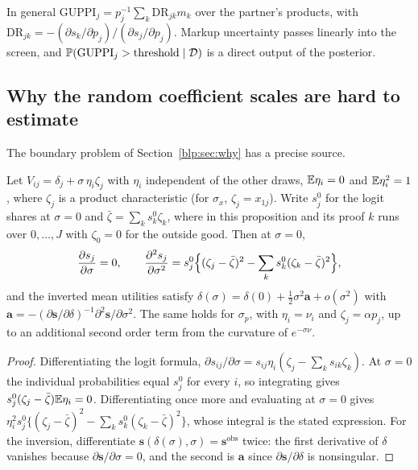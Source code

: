 \begin{remark}
In general $\mathrm{GUPPI}_j = p_j^{-1}\sum_{k}\mathrm{DR}_{jk}m_k$ over the partner's products, with
$\mathrm{DR}_{jk} = -(\partial s_k/\partial p_j)/(\partial s_j/\partial p_j)$. Markup uncertainty passes linearly into the screen, and $\mathbb{P}(\mathrm{GUPPI}_j > \text{threshold}\mid\mathcal{D})$ is a
direct output of the posterior.
\end{remark}

\subsection{Why the random coefficient scales are hard to estimate}

The boundary problem of Section~\ref{blp:sec:why} has a precise source.

\begin{proposition}\label{blp:prop:flat}
Let $V_{ij} = \delta_j + \sigma\,\eta_i \zeta_j$ with $\eta_i$ independent of the other draws,
$\mathbb{E}\eta_i = 0$ and $\mathbb{E}\eta_i^2 = 1$, where $\zeta_j$ is a product characteristic (for $\sigma_x$,
$\zeta_j = x_{1j}$). Write $s^0_j$ for the logit shares at $\sigma = 0$ and
$\bar\zeta = \sum_k s^0_k \zeta_k$, where in this proposition and its proof $k$ runs over $0,\dots,J$ with $\zeta_0 = 0$ for the outside good. Then at $\sigma = 0$,
\[
\frac{\partial s_j}{\partial\sigma} = 0,\qquad
\frac{\partial^2 s_j}{\partial\sigma^2} = s^0_j\Bigl\{(\zeta_j-\bar\zeta)^2 - \sum_k s^0_k (\zeta_k-\bar\zeta)^2\Bigr\},
\]
and the inverted mean utilities satisfy $\delta(\sigma) = \delta(0) + \tfrac12\sigma^2\bm a + o(\sigma^2)$
with $\bm a = -(\partial\bm s/\partial\delta)^{-1}\partial^2\bm s/\partial\sigma^2$. The same holds
for $\sigma_p$, with $\eta_i = \nu_i$ and $\zeta_j = \alpha p_j$, up to an additional second order term
from the curvature of $e^{-\sigma\nu}$.
\end{proposition}
\begin{proof}
Differentiating the logit formula, $\partial s_{ij}/\partial\sigma = s_{ij}\eta_i(\zeta_j -
\sum_k s_{ik}\zeta_k)$. At $\sigma=0$ the individual probabilities equal $s^0_j$ for every $i$, so
integrating gives $s^0_j(\zeta_j-\bar\zeta)\mathbb{E}\eta_i = 0$. Differentiating once more and evaluating at
$\sigma = 0$ gives $\eta_i^2 s^0_j\{(\zeta_j-\bar\zeta)^2 - \sum_k s^0_k(\zeta_k-\bar\zeta)^2\}$, whose
integral is the stated expression. For the inversion, differentiate $\bm s(\delta(\sigma),\sigma) =
\bm s^{\mathrm{obs}}$ twice: the first derivative of $\delta$ vanishes because
$\partial\bm s/\partial\sigma = 0$, and the second is $\bm a$ since $\partial\bm s/\partial\delta$ is
nonsingular.
\end{proof}

